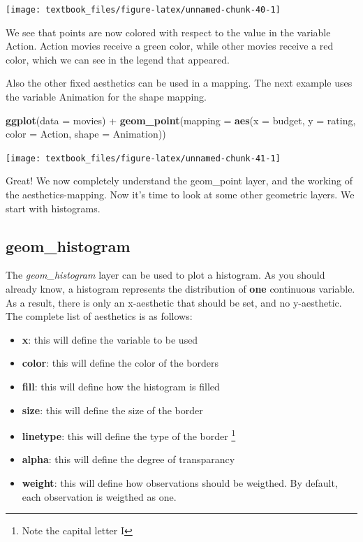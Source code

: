 \documentclass[]{tufte-book}
\newenvironment{Shaded}{}{}
\newcommand{\DataTypeTok}[1]{\textcolor[rgb]{0.56,0.13,0.00}{#1}}
\newcommand{\KeywordTok}[1]{\textcolor[rgb]{0.00,0.44,0.13}{\textbf{#1}}}
\newcommand{\NormalTok}[1]{#1}
\newcommand{\OperatorTok}[1]{\textcolor[rgb]{0.40,0.40,0.40}{#1}}
\newcommand{\StringTok}[1]{\textcolor[rgb]{0.25,0.44,0.63}{#1}}
\providecommand{\tightlist}{%
  \setlength{\itemsep}{0pt}\setlength{\parskip}{0pt}}
\begin{document}
\texttt{[image: textbook\_files/figure-latex/unnamed-chunk-40-1]}

We see that points are now colored with respect to the value in the variable Action. Action movies receive a green color, while other movies receive a red color, which we can see in the legend that appeared.

Also the other fixed aesthetics can be used in a mapping. The next example uses the variable Animation for the shape mapping.

\begin{Shaded}
\begin{Highlighting}[]
\KeywordTok{ggplot}\NormalTok{(}\DataTypeTok{data =}\NormalTok{ movies) }\OperatorTok{+}
\StringTok{    }\KeywordTok{geom_point}\NormalTok{(}\DataTypeTok{mapping =} \KeywordTok{aes}\NormalTok{(}\DataTypeTok{x =}\NormalTok{ budget, }
                             \DataTypeTok{y =}\NormalTok{ rating, }
                             \DataTypeTok{color =}\NormalTok{ Action, }
                              \DataTypeTok{shape =}\NormalTok{ Animation))}
\end{Highlighting}
\end{Shaded}

\texttt{[image: textbook\_files/figure-latex/unnamed-chunk-41-1]}

Great! We now completely understand the geom\_point layer, and the working of the aesthetics-mapping. Now it's time to look at some other geometric layers. We start with histograms.

\hypertarget{geom_histogram}{%
\subsection{geom\_histogram}\label{geom_histogram}}

The \emph{geom\_histogram} layer can be used to plot a histogram. As you should already know, a histogram represents the distribution of \textbf{one} continuous variable. As a result, there is only an x-aesthetic that should be set, and no y-aesthetic. The complete list of aesthetics is as follows:

\begin{itemize}
\tightlist
\item
  \textbf{x}: this will define the variable to be used
\item
  \textbf{color}: this will define the color of the borders
\item
  \textbf{fill}: this will define how the histogram is filled
\item
  \textbf{size}: this will define the size of the border
\item
  \textbf{linetype}: this will define the type of the border \footnote{Note the capital letter I}
\item
  \textbf{alpha}: this will define the degree of transparancy
\item
  \textbf{weight}: this will define how observations should be weigthed. By default, each observation is weigthed as one.
\end{itemize}
\end{document}
